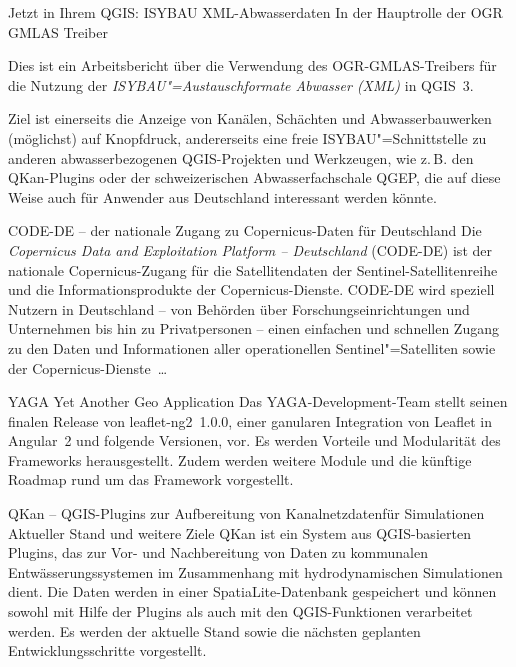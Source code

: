 %
{Jetzt in Ihrem QGIS: ISYBAU XML-Abwasserdaten\vspace{0.2em}}%
{In der Hauptrolle der OGR GMLAS Treiber}%
{%
Dies ist ein Arbeitsbericht über die Verwendung des OGR-GMLAS-Treibers für die Nutzung der
\emph{ISYBAU"=Austauschformate Abwasser (XML)} in QGIS~3.

Ziel ist einerseits die Anzeige von Kanälen,
Schächten und Abwasserbauwerken (möglichst) auf Knopfdruck, andererseits eine freie
ISYBAU"=Schnittstelle zu anderen abwasserbezogenen QGIS-Projekten und Werkzeugen, wie z.\,B. den
QKan-Plugins oder der schweizerischen Abwasserfachschale QGEP, die auf diese Weise auch für Anwender
aus Deutschland interessant werden könnte.%
}
\newpage

%
{CODE-DE -- der nationale Zugang zu Copernicus-Daten für Deutschland}%
{}%
{%
Die \emph{Copernicus Data and Exploitation Platform -- Deutschland} (CODE-DE) ist der nationale
Copernicus-Zugang für die Satellitendaten der Sentinel-Satellitenreihe und die
Informationsprodukte der Copernicus-Dienste. CODE-DE wird speziell Nutzern in Deutschland -- von
Behörden über Forschungseinrichtungen und Unternehmen bis hin zu Privatpersonen -- einen einfachen
und schnellen Zugang zu den Daten und Informationen aller operationellen Sentinel"=Satelliten sowie
der Copernicus-Dienste~\dots %
}


%
{YAGA}%
{Yet Another Geo Application}%
{%
Das YAGA-Development-Team stellt seinen finalen Release von leaflet-ng2~1.0.0, einer ganularen
Integration von Leaflet in Angular~2 und folgende Versionen, vor. Es werden Vorteile und Modularität
des Frameworks herausgestellt. Zudem werden weitere Module und die künftige Roadmap rund um das
Framework vorgestellt.%
}

%
{QKan -- QGIS-Plugins zur \mbox{Aufbereitung} von Kanalnetzdaten\linebreak für \mbox{Simulationen}\vspace{0.2em}}%
{Aktueller Stand und weitere Ziele}%
{%
QKan ist ein System aus QGIS-basierten Plugins, das zur Vor- und Nachbereitung von Daten zu
kommunalen Entwässerungssystemen im Zusammenhang mit hydrodynamischen Simulationen dient. Die Daten
werden in einer SpatiaLite-Datenbank gespeichert und können sowohl mit Hilfe der Plugins als auch
mit den QGIS-Funktionen verarbeitet werden. Es werden der aktuelle Stand sowie die nächsten
geplanten Entwicklungsschritte vorgestellt.%
}

